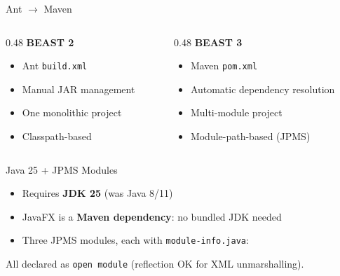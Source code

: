 \documentclass[aspectratio=169,11pt]{beamer}
\newcommand{\code}[1]{\texttt{#1}}
\begin{document}
\begin{frame}{Ant $\to$ Maven}
\begin{columns}[T]
\begin{column}{0.48\textwidth}
\textbf{BEAST 2}
\begin{itemize}
\item Ant \code{build.xml}
\item Manual JAR management
\item One monolithic project
\item Classpath-based
\end{itemize}
\end{column}
\begin{column}{0.48\textwidth}
\textbf{BEAST 3}
\begin{itemize}
\item Maven \code{pom.xml}
\item Automatic dependency resolution
\item Multi-module project
\item Module-path-based (JPMS)
\end{itemize}
\end{column}
\end{columns}
\end{frame}

\begin{frame}{Java 25 + JPMS Modules}
\begin{itemize}
\item Requires \textbf{JDK 25} (was Java 8/11)
\item JavaFX is a \textbf{Maven dependency}: no bundled JDK needed
\item Three JPMS modules, each with \code{module-info.java}:
\end{itemize}
\vspace{0.5em}
\begin{center}
\end{center}
\vspace{0.5em}
All declared as \code{open module} (reflection OK for XML unmarshalling).
\end{frame}
\end{document}
